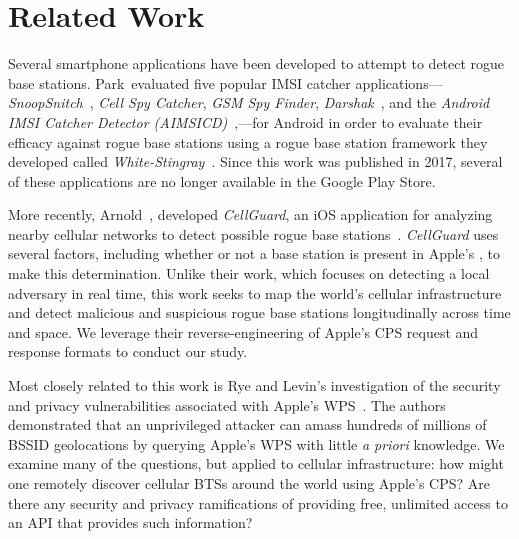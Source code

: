 \section{Related Work}
\label{sec:related}

Several smartphone applications have been developed to attempt to detect rogue
base stations. Park~\etal evaluated five popular IMSI catcher
applications---\emph{SnoopSnitch}~\cite{snoopsnitch}, \emph{Cell Spy Catcher},
\emph{GSM Spy Finder}, \emph{Darshak}~\cite{darshak}, and the \emph{Android IMSI
Catcher Detector (AIMSICD)}~\cite{AIMSICD},---for Android in order to evaluate
their efficacy against rogue base stations using a rogue base station framework
they developed called \emph{White-Stingray}~\cite{whitestingray}. Since this
work was published in 2017, several of these applications are no longer
available in the Google Play Store. 

More recently, Arnold~\etal, developed \emph{CellGuard}, an iOS application for
analyzing nearby cellular networks to detect possible rogue base
stations~\cite{cellguard}. \emph{CellGuard} uses several factors, including
whether or not a base station is present in Apple's \cps, to make this
determination. Unlike their work, which focuses on detecting a local adversary
in real time, this work seeks to map the world's cellular infrastructure and
detect malicious and suspicious rogue base stations longitudinally across time
and space. We leverage their reverse-engineering of Apple's \ac{CPS} request and
response formats to conduct our study.

Most closely related to this work is Rye and Levin's investigation of the
security and privacy vulnerabilities associated with Apple's
\ac{WPS}~\cite{rye2024surveilling}. The authors demonstrated that an
unprivileged attacker can amass hundreds of millions of \wifi \ac{BSSID}
geolocations by querying Apple's \ac{WPS} with little \emph{a priori} knowledge.
We examine many of the questions, but applied to cellular infrastructure: how
might one remotely discover cellular \acp{BTS} around the world using Apple's
\ac{CPS}? Are there any security and privacy ramifications of providing free,
unlimited access to an API that provides such information? 


